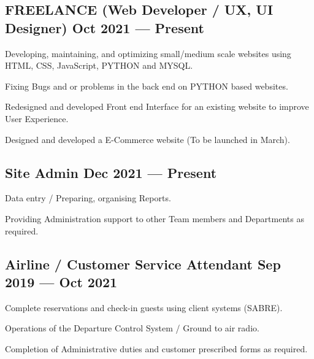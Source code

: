 \documentclass[letter,10pt]{article}
\begin{document}
\subsection{{FREELANCE (Web Developer / UX, UI Designer) \hfill Oct 2021 --- Present}}
\begin{zitemize}
\item Developing, maintaining, and optimizing small/medium scale websites using HTML, CSS, JavaScript, PYTHON and MYSQL.
\item Fixing Bugs and or problems in the back end on PYTHON based websites.
\item Redesigned and developed Front end Interface for an existing website to improve User Experience.
\item Designed and developed a E-Commerce website (To be launched in March).
\end{zitemize}

\subsection{{Site Admin \hfill Dec 2021 --- Present}}
\begin{zitemize}
\item Data entry / Preparing, organising Reports.
\item Providing Administration support to other Team members and Departments as required.
\end{zitemize}

\subsection{{Airline / Customer Service Attendant \hfill Sep 2019 --- Oct 2021}}
\begin{zitemize}
\item Complete reservations and check-in guests using client systems (SABRE).
\item Operations of the Departure Control System / Ground to air radio.
\item Completion of Administrative duties and customer prescribed forms as required.
\end{zitemize}
\end{document}

